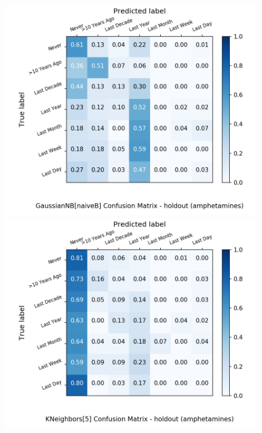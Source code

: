 \begin{figure}[H]
\begin{minipage}[b]{0.32\textwidth}
	\end{minipage}
	\begin{minipage}[b]{0.32\textwidth}
		\includegraphics[width=1.1\textwidth]{Plots/drugs/amphetamines_GaussianNB_naiveB_balance_False_holdout.png}
	\end{minipage}
	\begin{minipage}[b]{0.32\textwidth}
		\includegraphics[width=1.1\textwidth]{Plots/drugs/amphetamines_KNeighbors_5_balance_False_holdout.png}
  \end{minipage}
	\begin{minipage}[b]{0.32\textwidth}

\end{minipage}
\end{figure}
